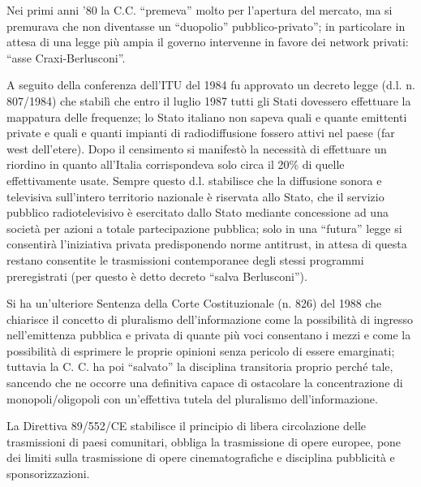 Nei primi anni '80 la C.C. “premeva” molto per l’apertura del mercato, ma si premurava che non diventasse un “duopolio” pubblico-privato”; in particolare in attesa di una legge più ampia il governo intervenne in favore dei network privati: “asse Craxi-Berlusconi”.

A seguito della conferenza dell’ITU del 1984 fu approvato un decreto legge (d.l. n. 807/1984) che stabilì che entro il luglio 1987 tutti gli Stati dovessero effettuare la mappatura delle frequenze; lo Stato italiano non sapeva quali e quante emittenti private e quali e quanti impianti di radiodiffusione fossero attivi nel paese (far west dell’etere). Dopo il censimento si manifestò la necessità di effettuare un riordino in quanto all’Italia corrispondeva solo circa il 20\% di quelle effettivamente usate. Sempre questo d.l. stabilisce che la diffusione sonora e televisiva sull’intero territorio nazionale è riservata allo Stato, che il servizio pubblico radiotelevisivo è esercitato dallo Stato mediante concessione ad una società per azioni a totale partecipazione pubblica; solo in una “futura” legge si consentirà l’iniziativa privata predisponendo norme antitrust, in attesa di questa restano consentite le trasmissioni contemporanee degli stessi programmi preregistrati (per questo è detto decreto “salva Berlusconi”).\bigskip


Si ha un’ulteriore Sentenza della Corte Costituzionale (n. 826) del 1988 che chiarisce il concetto di pluralismo dell’informazione come la possibilità di ingresso nell’emittenza pubblica e privata di quante più voci consentano i mezzi e come la possibilità di esprimere le proprie opinioni senza pericolo di essere emarginati; tuttavia la C. C. ha poi “salvato” la disciplina transitoria proprio perché tale, sancendo che ne occorre una definitiva capace di ostacolare la concentrazione di monopoli/oligopoli con un’effettiva tutela del pluralismo dell’informazione.


La Direttiva 89/552/CE stabilisce il principio di libera circolazione delle trasmissioni di paesi comunitari, obbliga la trasmissione di opere europee, pone dei limiti sulla trasmissione di opere cinematografiche e disciplina pubblicità e sponsorizzazioni.
